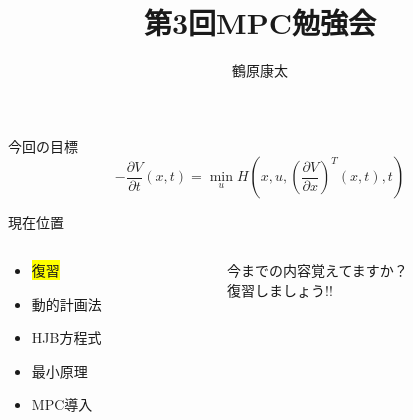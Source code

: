 \documentclass[dvipdfmx,12pt]{beamer}
\title{第3回MPC勉強会}
\author{鶴原康太}
\begin{document}
    \frame{\maketitle}

    \begin{frame}{今回の目標}
        \begin{equation*}
            -\frac{\partial V}{\partial t}\left(x,t\right) = \min _u H\left(x, u, \left( \frac{\partial V}{\partial x} \right)^T\left(x, t\right), t \right)
        \end{equation*}
    \end{frame}

    \begin{frame}{現在位置}
        \begin{columns}
            \begin{column}{.4\textwidth}
                \begin{itemize}
                    \item \colorbox{yellow}{復習}
                    \item 動的計画法
                    \item HJB方程式
                    \item 最小原理
                    \item MPC導入
                \end{itemize}
            \end{column}
    
            \begin{column}{.6\textwidth}
                今までの内容覚えてますか？\\
                復習しましょう!!
            \end{column}
        \end{columns}
    \end{frame}
\end{document}
